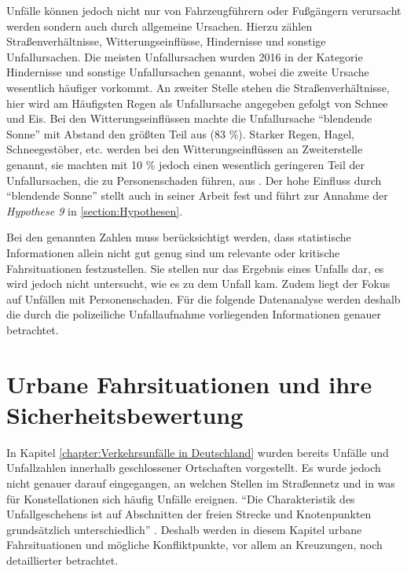 Unfälle können jedoch nicht nur von Fahrzeugführern oder Fußgängern verursacht werden sondern auch durch allgemeine Ursachen. Hierzu zählen Straßenverhältnisse, Witterungseinflüsse, Hindernisse und sonstige Unfallursachen. Die meisten Unfallursachen wurden 2016 in der Kategorie Hindernisse und sonstige Unfallursachen genannt, wobei die zweite Ursache wesentlich häufiger vorkommt. An zweiter Stelle stehen die Straßenverhältnisse, hier wird am Häufigsten Regen als Unfallursache angegeben gefolgt von Schnee und Eis. Bei den Witterungseinflüssen machte die Unfallursache \enquote{blendende Sonne} mit Abstand den größten Teil aus (83 \%). Starker Regen, Hagel, Schneegestöber, etc. werden bei den Witterungseinflüssen an Zweiterstelle genannt, sie machten mit 10 \% jedoch einen wesentlich geringeren Teil der Unfallursachen, die zu Personenschaden führen, aus \parencite[S. 305]{StatistischesBundesamt.2018b}. Der hohe Einfluss durch \enquote{blendende Sonne} stellt auch \Textcite[S. 151]{Grundl.2005} in seiner Arbeit fest und führt zur Annahme der \textit{Hypothese 9} in \ref{section:Hypothesen}.

Bei den genannten Zahlen muss berücksichtigt werden, dass statistische Informationen allein nicht gut genug sind um relevante oder kritische Fahrsituationen festzustellen. Sie stellen nur das Ergebnis eines Unfalls dar, es wird jedoch nicht untersucht, wie es zu dem Unfall kam. Zudem liegt der Fokus auf Unfällen mit Personenschaden. Für die folgende Datenanalyse werden deshalb die durch die polizeiliche Unfallaufnahme vorliegenden Informationen genauer betrachtet. 

\section{Urbane Fahrsituationen und ihre Sicherheitsbewertung}
In Kapitel \ref{chapter:Verkehrsunfälle in Deutschland} wurden bereits Unfälle und Unfallzahlen innerhalb geschlossener Ortschaften vorgestellt. Es wurde jedoch nicht genauer darauf eingegangen, an welchen Stellen im Straßennetz und in was für Konstellationen sich häufig Unfälle ereignen. \enquote{Die Charakteristik des Unfallgeschehens ist auf Abschnitten der freien Strecke und Knotenpunkten grundsätzlich unterschiedlich} \parencite[S. 83]{Aurich.2015}. Deshalb werden in diesem Kapitel urbane Fahrsituationen und mögliche Konfliktpunkte, vor allem an Kreuzungen, noch detaillierter betrachtet.

